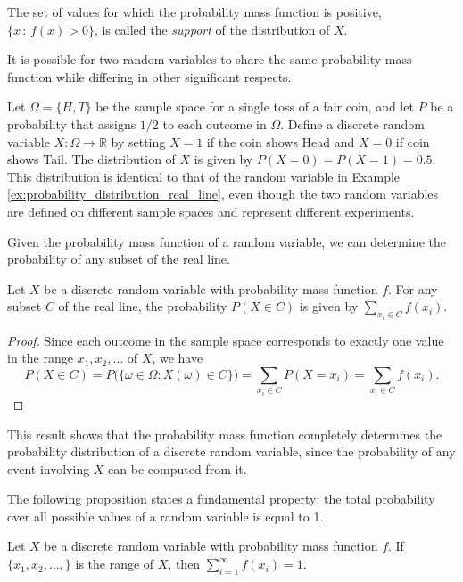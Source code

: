 The set of values for which the probability mass function is positive, $\{x \,:\, f(x) > 0\}$, is called the \emph{support} of the distribution of $X$.

It is possible for two random variables to share the same probability mass function while differing in other significant respects.

\begin{example}
Let $\Omega = \{H, T\}$ be the sample space for a single toss of a fair coin, and let $P$ be a probability that assigns $1/2$ to each outcome in $\Omega$. Define a discrete random variable $X: \Omega \rightarrow \mathbb{R}$ by setting $X = 1$ if the coin shows Head and $X = 0$ if coin shows Tail. The distribution of $X$ is given by $P(X = 0) = P(X = 1) = 0.5$. This distribution is identical to that of the random variable in Example \ref{ex:probability_distribution_real_line}, even though the two random variables are defined on different sample spaces and represent different experiments.
\end{example}

Given the probability mass function of a random variable, we can determine the probability of any subset of the real line.

\begin{proposition}
Let $X$ be a discrete random variable with probability mass function $f$. For any subset $C$ of the real line, the probability $P(X \in C)$ is given by $\sum_{x_i \in C} f(x_i)$.
\end{proposition}
\begin{proof}
Since each outcome in the sample space corresponds to exactly one value in the range ${x_1, x_2, \ldots}$ of $X$, we have
\[
P(X \in C) = P\big( \{\omega \in \Omega : X(\omega) \in C\} \big)
= \sum_{x_i \in C} P(X = x_i)
= \sum_{x_i \in C} f(x_i).
\]
\end{proof}

This result shows that the probability mass function completely determines the probability distribution of a discrete random variable, since the probability of any event involving $X$ can be computed from it.

The following proposition states a fundamental property: the total probability over all possible values of a random variable is equal to 1.

\begin{proposition}
Let $X$ be a discrete random variable with probability mass function $f$. If $\{ x_1, x_2, \ldots, \}$ is the range of $X$, then $\sum_{i=1}^{\infty}f\left(x_{i}\right)=1$.
\end{proposition}

